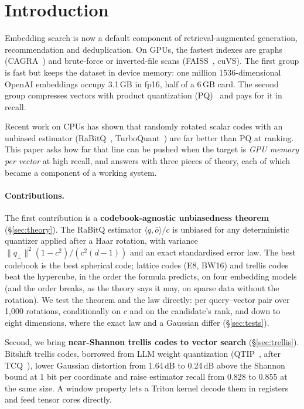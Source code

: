 \documentclass[fleqn,10pt]{wlscirep}
\begin{document}
\section{Introduction}
Embedding search is now a default component of retrieval-augmented generation, recommendation and deduplication. On GPUs, the fastest indexes are graphs (CAGRA~\cite{ootomo2024cagra}) and brute-force or inverted-file scans (FAISS~\cite{douze2024faiss}, cuVS). The first group is fast but keeps the dataset in device memory: one million 1536-dimensional OpenAI embeddings occupy 3.1\,GB in fp16, half of a 6\,GB card. The second group compresses vectors with product quantization (PQ)~\cite{jegou2011pq} and pays for it in recall.

Recent work on CPUs has shown that randomly rotated scalar codes with an unbiased estimator (RaBitQ~\cite{gao2024rabitq,gao2025extended}, TurboQuant~\cite{zandieh2025turboquant}) are far better than PQ at ranking. This paper asks how far that line can be pushed when the target is \emph{GPU memory per vector} at high recall, and answers with three pieces of theory, each of which became a component of a working system.

\paragraph{Contributions.} The first contribution is a \textbf{codebook-agnostic unbiasedness theorem} (\S\ref{sec:theory}). The RaBitQ estimator $\langle q,\bar o\rangle/c$ is unbiased for any deterministic quantizer applied after a Haar rotation, with variance $\|q_\perp\|^2(1-c^2)/(c^2(d-1))$ and an exact standardised error law. The best codebook is the best spherical code; lattice codes (E8, BW16) and trellis codes beat the hypercube, in the order the formula predicts, on four embedding models (and the order breaks, as the theory says it may, on sparse data without the rotation). We test the theorem and the law directly: per query--vector pair over 1{,}000 rotations, conditionally on $c$ and on the candidate's rank, and down to eight dimensions, where the exact law and a Gaussian differ (\S\ref{sec:tests}).

Second, we bring \textbf{near-Shannon trellis codes to vector search} (\S\ref{sec:trellis}). Bitshift trellis codes, borrowed from LLM weight quantization (QTIP~\cite{tseng2024qtip}, after TCQ~\cite{marcellin1990tcq}), lower Gaussian distortion from 1.64\,dB to 0.24\,dB above the Shannon bound at 1 bit per coordinate and raise estimator recall from 0.828 to 0.855 at the same size. A window property lets a Triton kernel decode them in registers and feed tensor cores directly.
\end{document}
